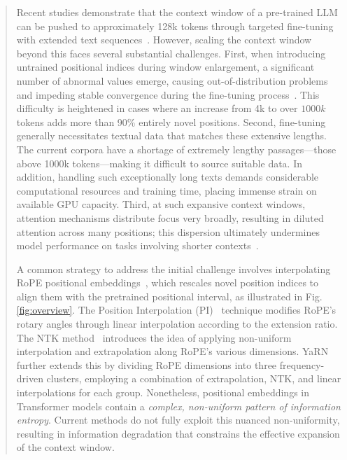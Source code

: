 \begin{abstract}
Recent studies demonstrate that the context window of a pre-trained LLM can be pushed to approximately 128k tokens through targeted fine-tuning with extended text sequences~\cite{longlora,pi,yarn,zhang2024soaring,liu2023scaling}. However, scaling the context window beyond this faces several substantial challenges. First, when introducing untrained positional indices during window enlargement, a significant number of abnormal values emerge, causing out-of-distribution problems and impeding stable convergence during the fine-tuning process~\cite{pi}. This difficulty is heightened in cases where an increase from 4k to over $1000k$ tokens adds more than 90\% entirely novel positions. Second, fine-tuning generally necessitates textual data that matches these extensive lengths. The current corpora have a shortage of extremely lengthy passages—those above 1000k tokens—making it difficult to source suitable data. In addition, handling such exceptionally long texts demands considerable computational resources and training time, placing immense strain on available GPU capacity. Third, at such expansive context windows, attention mechanisms distribute focus very broadly, resulting in diluted attention across many positions; this dispersion ultimately undermines model performance on tasks involving shorter contexts~\cite{pi}.

A common strategy to address the initial challenge involves interpolating RoPE positional embeddings~\cite{rope,pi}, which rescales novel position indices to align them with the pretrained positional interval, as illustrated in Fig.\ref{fig:overview}. The Position Interpolation (PI)~\cite{pi} technique modifies RoPE's rotary angles through linear interpolation according to the extension ratio. The NTK method~\cite{ntk,dynamicntk} introduces the idea of applying non-uniform interpolation and extrapolation along RoPE’s various dimensions. YaRN~\cite{yarn} further extends this by dividing RoPE dimensions into three frequency-driven clusters, employing a combination of extrapolation, NTK, and linear interpolations for each group. Nonetheless, positional embeddings in Transformer models contain a \emph{complex, non-uniform pattern of information entropy}. Current methods do not fully exploit this nuanced non-uniformity, resulting in information degradation that constrains the effective expansion of the context window.


\end{abstract}
